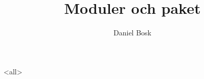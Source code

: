 \documentclass[ignoreframetext]{beamer}
\begin{document}
\title{%
  Moduler och paket
}
\author{Daniel Bosk}

\begin{frame}
  \maketitle
\end{frame}

\mode<all>

\mode*
%

\end{document}
